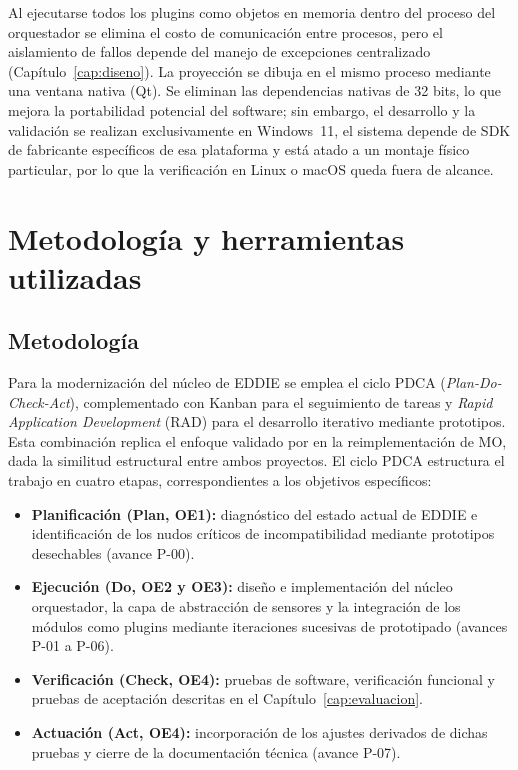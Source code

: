 Al ejecutarse todos los plugins como objetos en memoria dentro del proceso del orquestador se elimina el costo de comunicación entre procesos, pero el aislamiento de fallos depende del manejo de excepciones centralizado (Capítulo~\ref{cap:diseno}). La proyección se dibuja en el mismo proceso mediante una ventana nativa (Qt). Se eliminan las dependencias nativas de 32 bits, lo que mejora la portabilidad potencial del software; sin embargo, el desarrollo y la validación se realizan exclusivamente en Windows~11, el sistema depende de SDK de fabricante específicos de esa plataforma y está atado a un montaje físico particular, por lo que la verificación en Linux o macOS queda fuera de alcance.

\section{Metodología y herramientas utilizadas}

\subsection{Metodología}

Para la modernización del núcleo de EDDIE se emplea el ciclo PDCA (\textit{Plan-Do-Check-Act}), complementado con Kanban para el seguimiento de tareas y \textit{Rapid Application Development} (RAD) para el desarrollo iterativo mediante prototipos. Esta combinación replica el enfoque validado por \citet{figueroa2025} en la reimplementación de MO, dada la similitud estructural entre ambos proyectos. El ciclo PDCA estructura el trabajo en cuatro etapas, correspondientes a los objetivos específicos:

\begin{itemize}
  \item \textbf{Planificación (Plan, OE1):} diagnóstico del estado actual de EDDIE e identificación de los nudos críticos de incompatibilidad mediante prototipos desechables (avance P-00).
  \item \textbf{Ejecución (Do, OE2 y OE3):} diseño e implementación del núcleo orquestador, la capa de abstracción de sensores y la integración de los módulos como plugins mediante iteraciones sucesivas de prototipado (avances P-01 a P-06).
  \item \textbf{Verificación (Check, OE4):} pruebas de software, verificación funcional y pruebas de aceptación descritas en el Capítulo~\ref{cap:evaluacion}.
  \item \textbf{Actuación (Act, OE4):} incorporación de los ajustes derivados de dichas pruebas y cierre de la documentación técnica (avance P-07).
\end{itemize}


